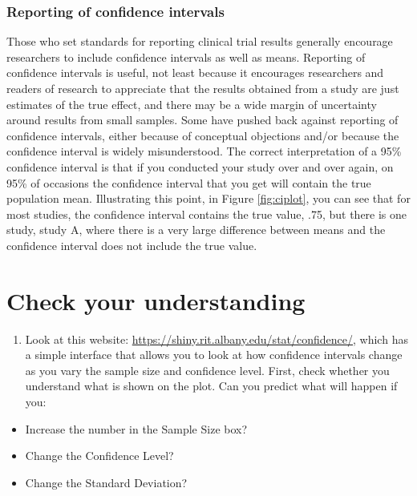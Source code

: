 \documentclass{krantz}
\providecommand{\tightlist}{%
\setlength{\itemsep}{0pt}\setlength{\parskip}{0pt}}
\begin{document}
\hypertarget{reporting-of-confidence-intervals}{%
\subsubsection*{Reporting of confidence intervals}\label{reporting-of-confidence-intervals}}

\leavevmode{}%
Those who set standards for reporting clinical trial results generally encourage researchers to include confidence intervals as well as means. Reporting of confidence intervals is useful, not least because it encourages researchers and readers of research to appreciate that the results obtained from a study are just estimates of the true effect, and there may be a wide margin of uncertainty around results from small samples. Some have pushed back against reporting of confidence intervals, either because of conceptual objections and/or because the confidence interval is widely misunderstood. The correct interpretation of a 95\% confidence interval is that if you conducted your study over and over again, on 95\% of occasions the confidence interval that you get will contain the true population mean. Illustrating this point, in Figure \ref{fig:ciplot}, you can see that for most studies, the confidence interval contains the true value, .75, but there is one study, study A, where there is a very large difference between means and the confidence interval does not include the true value.

\hypertarget{check-your-understanding-10}{%
\section{Check your understanding}\label{check-your-understanding-10}}

\begin{enumerate}
\def\labelenumi{\arabic{enumi}.}
\tightlist
\item
  Look at this website: \url{https://shiny.rit.albany.edu/stat/confidence/}, which has a simple interface that allows you to look at how confidence intervals change as you vary the sample size and confidence level. First, check whether you understand what is shown on the plot. Can you predict what will happen if you:
\end{enumerate}

\begin{itemize}
\tightlist
\item
  Increase the number in the Sample Size box?\\
\item
  Change the Confidence Level?\\
\item
  Change the Standard Deviation?
\end{itemize}
\end{document}
